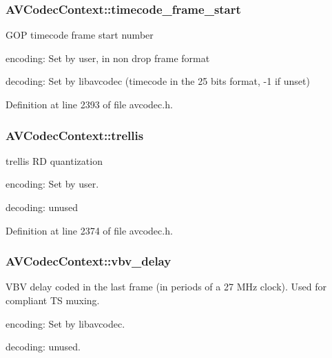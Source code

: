\subsubsection[{\texorpdfstring{timecode\+\_\+frame\+\_\+start}{timecode_frame_start}}]{ A\+V\+Codec\+Context\+::timecode\+\_\+frame\+\_\+start}\hypertarget{struct_a_v_codec_context_a18c0dc7988a2d4ff291980001e0ceef9}{}\label{struct_a_v_codec_context_a18c0dc7988a2d4ff291980001e0ceef9}
G\+OP timecode frame start number
\begin{DoxyItemize}
\item encoding\+: Set by user, in non drop frame format
\item decoding\+: Set by libavcodec (timecode in the 25 bits format, -\/1 if unset) 
\end{DoxyItemize}

Definition at line 2393 of file avcodec.\+h.

\subsubsection[{\texorpdfstring{trellis}{trellis}}]{ A\+V\+Codec\+Context\+::trellis}\hypertarget{struct_a_v_codec_context_a025940af0d5249418d6ac7e183fdd40f}{}\label{struct_a_v_codec_context_a025940af0d5249418d6ac7e183fdd40f}
trellis RD quantization
\begin{DoxyItemize}
\item encoding\+: Set by user.
\item decoding\+: unused 
\end{DoxyItemize}

Definition at line 2374 of file avcodec.\+h.

\subsubsection[{\texorpdfstring{vbv\+\_\+delay}{vbv_delay}}]{ A\+V\+Codec\+Context\+::vbv\+\_\+delay}\hypertarget{struct_a_v_codec_context_a35469829873ff8e5444040323e8e1e59}{}\label{struct_a_v_codec_context_a35469829873ff8e5444040323e8e1e59}
V\+BV delay coded in the last frame (in periods of a 27 M\+Hz clock). Used for compliant TS muxing.
\begin{DoxyItemize}
\item encoding\+: Set by libavcodec.
\item decoding\+: unused. 
\end{DoxyItemize}

